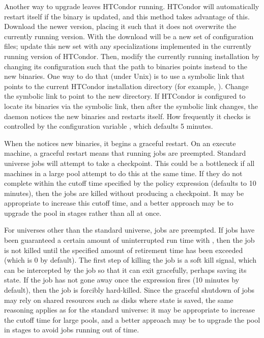 Another way to upgrade leaves HTCondor running. 
HTCondor will automatically restart itself if the  binary
is updated,
and this method takes advantage of this. 
Download the newer version, placing it such that it does not 
overwrite the currently running version.
With the download will be a new set of configuration files;
update this new set with any specializations implemented in the currently
running version of HTCondor.
Then, modify the currently running installation by changing its
configuration such that the path to binaries points instead
to the new binaries.
One way to do that (under Unix) is to use a symbolic link that points 
to the current HTCondor installation directory (for example, ).
Change the symbolic link to point to the new directory. 
If HTCondor is configured to locate its binaries via the symbolic link, 
then after the symbolic link changes, 
the  daemon notices the new binaries and restarts itself. 
How frequently it checks is controlled by the configuration variable 
, which defaults 5 minutes.

When the  notices new binaries, 
it begins a graceful restart. 
On an execute machine, 
a graceful restart means that running jobs are preempted. 
Standard universe jobs will attempt to take a checkpoint. 
This could be a bottleneck if all machines in a large pool 
attempt to do this at the same time. 
If they do not complete within the cutoff time specified by the  
policy expression (defaults to 10 minutes), 
then the jobs are killed without producing a checkpoint. 
It may be appropriate to increase this cutoff time, 
and a better approach may be to upgrade the pool in stages 
rather than all at once. 

For universes other than the standard universe, jobs are preempted. 
If jobs have been guaranteed a certain amount of uninterrupted run time 
with , 
then the job is not killed until the specified amount of 
retirement time has been exceeded (which is 0 by default). 
The first step of killing the job is a soft kill signal, 
which can be intercepted by the job so that it can exit gracefully, 
perhaps saving its state. 
If the job has not gone away once the  expression fires 
(10 minutes by default), 
then the job is forcibly hard-killed. 
Since the graceful shutdown of jobs may rely on shared resources such as disks 
where state is saved, 
the same reasoning applies as for the standard universe: 
it may be appropriate to increase the cutoff time 
for large pools, 
and a better approach may be to upgrade the pool in stages 
to avoid jobs running out of time. 

